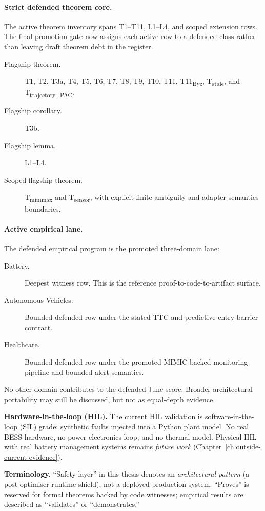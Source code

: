 \paragraph{Strict defended theorem core.}
The active theorem inventory spans T1--T11, L1--L4, and scoped extension
rows.  The final promotion gate now assigns each active row to a defended
class rather than leaving draft theorem debt in the register.
\begin{description}
  \item[Flagship theorem.] T1, T2, T3a, T4, T5, T6, T7, T8, T9, T10, T11,
    T11\textsubscript{Byz}, T\textsubscript{stale}, and
    T\textsubscript{trajectory\_PAC}.
  \item[Flagship corollary.] T3b.
  \item[Flagship lemma.] L1--L4.
  \item[Scoped flagship theorem.] T\textsubscript{minimax} and
    T\textsubscript{sensor}, with explicit finite-ambiguity and adapter
    semantics boundaries.
\end{description}

\paragraph{Active empirical lane.}
The defended empirical program is the promoted three-domain lane:
\begin{description}
  \item[Battery.] Deepest witness row.  This is the reference proof-to-code-to-artifact surface.
  \item[Autonomous Vehicles.] Bounded defended row under the stated TTC and predictive-entry-barrier contract.
  \item[Healthcare.] Bounded defended row under the promoted MIMIC-backed monitoring pipeline and bounded alert semantics.
\end{description}

\noindent No other domain contributes to the defended June score.  Broader
architectural portability may still be discussed, but not as equal-depth
evidence.

\noindent\textbf{Hardware-in-the-loop (HIL).}  The current HIL
validation is software-in-the-loop (SIL) grade: synthetic faults
injected into a Python plant model.  No real BESS hardware, no
power-electronics loop, and no thermal model.  Physical HIL with
real battery management systems remains \emph{future work}
(Chapter~\ref{ch:outside-current-evidence}).\smallskip

\noindent\textbf{Terminology.}
``Safety layer'' in this thesis denotes an
\emph{architectural pattern} (a post-optimiser runtime shield), not a
deployed production system.  ``Proves'' is reserved for formal theorems
backed by code witnesses; empirical results are described as
``validates'' or ``demonstrates.''
